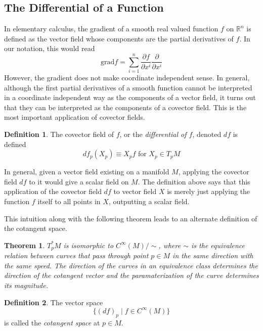 \documentclass{article}
\newtheorem{theorem}{Theorem}[section]
\theoremstyle{remark}
\theoremstyle{definition}
\newtheorem{definition}{Definition}[section]
\begin{document}
  \subsection{The Differential of a Function}

    In elementary calculus, the gradient of a smooth real valued function $f$ on $\mathbb{R}^n$ is defined as the vector field whose components are the partial derivatives of $f$. In our notation, this would read
    \[\text{grad} f = \sum_{i=1}^n \frac{\partial f}{\partial x^i} \frac{\partial}{\partial x^i}\]
    However, the gradient does not make coordinate independent sense. In general, although the first partial derivatives of a smooth function cannot be interpreted in a coordinate independent way as the components of a vector field, it turns out that they can be interpreted as the components of a covector field. This is the most important application of covector fields. 

    \begin{definition}
    The covector field of $f$, or the \textit{differential of $f$}, denoted $df$ is defined
    \[df_p (X_p) \equiv X_p f \text{ for } X_p \in T_p M\]
    \end{definition}

    In general, given a vector field existing on a manifold $M$, applying the covector field $df$ to it would give a scalar field on $M$. The definition above says that this application of the covector field $df$ to vector field $X$ is merely just applying the function $f$ itself to all points in $X$, outputting a scalar field. 

    This intuition along with the following theorem leads to an alternate definition of the cotangent space. 

    \begin{theorem}
    $T_p^* M$ is isomorphic to $C^\infty(M) / \sim$, where $\sim$ is the equivalence relation between curves that pass through point $p \in M$ in the same direction with the same speed. The direction of the curves in an equivalence class determines the direction of the cotangent vector and the paramaterization of the curve determines its magnitude. 
    \end{theorem}

    \begin{definition}
    The vector space 
    \[ \{ (d f)_{p} \; | \; f \in C^{\infty} (M) \} \]
    is called the \textit{cotangent space} at $p \in M$. 
    \end{definition}
\end{document}
